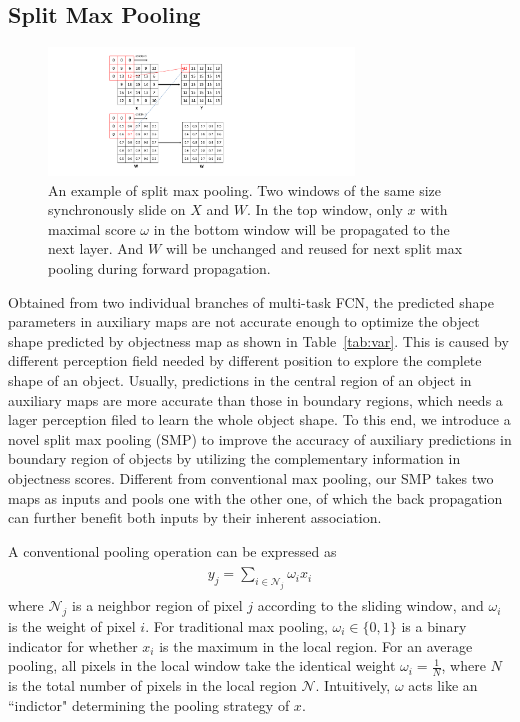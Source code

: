 \subsection{Split Max Pooling}
\label{sec:split-max-pooling}
\begin{figure}
    \begin{center}
        \includegraphics[width=3.2in]{figures/FigSMP.pdf}
    \end{center}
    \caption{An example of split max pooling. 
        Two windows of the same size synchronously slide on $X$ and $W$.
        In the top window, only $x$ with maximal score $\omega$ in the bottom window will be propagated to the next layer.
        And $W$ will be unchanged and reused for next split max pooling during forward propagation.}
    \label{FigSMP}
\end{figure}

Obtained from two individual branches of multi-task FCN, the predicted shape parameters in auxiliary maps are not accurate enough to optimize the object shape predicted by objectness map as shown in Table~\ref{tab:var}.
This is caused by different perception field needed by different position to explore the complete shape of an object.
Usually, predictions in the central region of an object in auxiliary maps are more accurate than those in boundary regions, which needs a lager perception filed to learn the whole object shape.
To this end, we introduce a novel split max pooling (SMP) to improve the accuracy of auxiliary predictions in boundary region of objects by utilizing the complementary information in objectness scores.
Different from conventional max pooling, our SMP takes two maps as inputs and pools one with the other one, of which the back propagation can further benefit both inputs by their inherent association.

A conventional pooling operation can be expressed as
\begin{eqnarray}\label{pooling}
\begin{aligned}
y_{j} = \sum_{i\in \mathcal{N}_{j}} \omega_{i}x_{i}
\end{aligned}
\end{eqnarray}
where $\mathcal{N}_{j}$ is a neighbor region of pixel $j$ according to the sliding window, and $\omega_{i}$ is the weight of pixel $i$.
For traditional max pooling, $\omega_i \in \{0,1\}$ is a binary indicator for whether $x_i$ is the maximum in the local region.
For an average pooling, all pixels in the local window take the identical weight $\omega_i=\frac{1}{N}$, where $N$ is the total number of pixels in the local region $\mathcal{N}$.
Intuitively, $\omega$ acts like an ``indictor" determining the pooling strategy of $x$.



